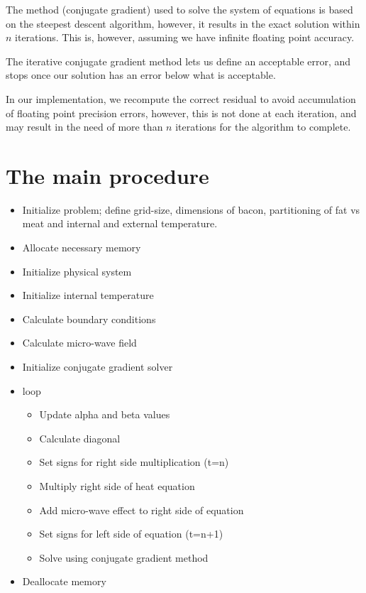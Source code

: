 The method (conjugate gradient) used to solve the system of equations is based on 
the steepest descent algorithm, however, it results in the exact solution within
$n$ iterations. This is, however, assuming we have infinite floating point accuracy.

The iterative conjugate gradient method lets us define an acceptable error, and stops
once our solution has an error below what is acceptable.

In our implementation, we recompute the correct residual to avoid accumulation of
floating point precision errors, however, this is not done at each iteration, and may
result in the need of more than $n$ iterations for the algorithm to complete.

\section{The main procedure}

\begin{itemize}
  \item Initialize problem; define grid-size, dimensions of bacon, partitioning of fat vs meat
  and internal and external temperature.
  \item Allocate necessary memory
  \item Initialize physical system
  \item Initialize internal temperature
  \item Calculate boundary conditions
  \item Calculate micro-wave field
  \item Initialize conjugate gradient solver
  \item loop
  \begin{itemize}
    \item Update alpha and beta values
    \item Calculate diagonal
    \item Set signs for right side multiplication (t=n)
    \item Multiply right side of heat equation
    \item Add micro-wave effect to right side of equation
    \item Set signs for left side of equation (t=n+1)
    \item Solve using conjugate gradient method
  \end{itemize}
\item Deallocate memory
\end{itemize}

